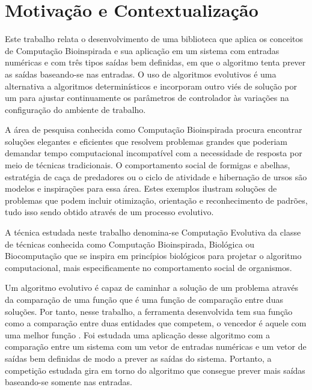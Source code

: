 \section{Motivação e Contextualização}

\newcommand{\SE}{Sistema Evolutivo (SE)\xspace}

Este trabalho relata o desenvolvimento de uma biblioteca que aplica os conceitos de Computação Bioinspirada e sua aplicação em um sistema com entradas numéricas e com três tipos saídas bem definidas, em que o algoritmo tenta prever as saídas baseando-se nas entradas. O uso de algoritmos evolutivos é uma alternativa a algoritmos determinísticos  e incorporam outro viés de solução por um  \cite{Layzell1999} para ajustar continuamente os parâmetros de controlador às variações na configuração do ambiente de trabalho.

A área de pesquisa conhecida como Computação Bioinspirada procura encontrar soluções elegantes e eficientes que resolvem problemas grandes que poderiam demandar tempo computacional incompatível com a necessidade de resposta por meio de técnicas tradicionais. O comportamento social de formigas e abelhas, estratégia de caça de predadores ou o ciclo de atividade e hibernação de ursos são modelos e inspirações para essa área. Estes exemplos ilustram soluções de problemas que podem incluir otimização, orientação e reconhecimento de padrões, tudo isso sendo obtido através de um processo evolutivo.\cite{Simoes2000}

A técnica estudada neste trabalho denomina-se Computação Evolutiva da classe de técnicas conhecida como Computação Bioinspirada, Biológica ou Biocomputação que se inspira em princípios biológicos para projetar o algoritmo computacional, mais especificamente no comportamento social de organismos.

Um algoritmo evolutivo é capaz de caminhar a solução de um problema através da comparação de uma função \fitness que é uma função de comparação entre duas soluções. Por tanto, nesse trabalho, a ferramenta desenvolvida tem sua função \fitness como a comparação entre duas entidades que competem, o vencedor é aquele com uma melhor função \fitness. Foi estudada uma aplicação desse algoritmo com a comparação entre um sistema com um vetor de entradas numéricas e um vetor de saídas bem definidas de modo a prever as saídas do sistema. Portanto, a competição estudada gira em torno do algoritmo que consegue prever mais saídas baseando-se somente nas entradas.

